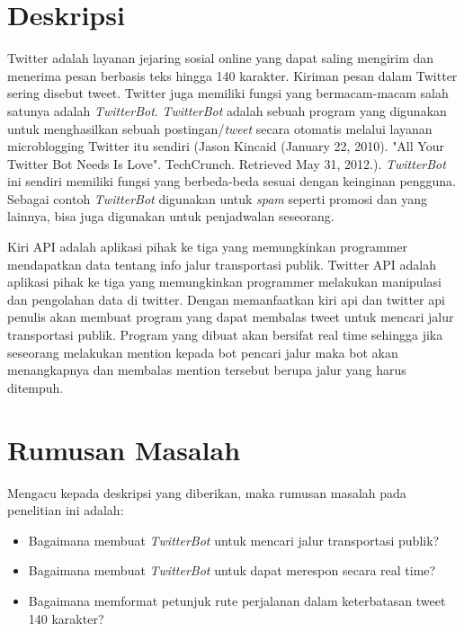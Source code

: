 \documentclass[a4paper,twoside]{article}
\begin{document}
\title{\@judultopik}
\author{\nama \textendash \@npm} 

\newcommand{\nama}{Kevin Theodorus Yonathan}
\newcommand{\@npm}{2011730037}
\newcommand{\@judultopik}{Pembuatan \textit{TwitterBot} Untuk Mencari Jalur Transportasi Publik} %
\newcommand{\jumpemb}{1} %
\newcommand{\tanggal}{05/16/2014}
\maketitle


\section{Deskripsi}

Twitter adalah layanan jejaring sosial online yang dapat saling mengirim dan menerima pesan berbasis teks hingga 140 karakter. Kiriman pesan dalam Twitter sering disebut tweet. Twitter juga  memiliki fungsi yang bermacam-macam salah satunya adalah \textit{TwitterBot}. \textit{TwitterBot} adalah sebuah program yang digunakan untuk menghasilkan sebuah postingan/\textit{tweet} secara otomatis melalui layanan microblogging Twitter itu sendiri  (Jason Kincaid (January 22, 2010). "All Your Twitter Bot Needs Is Love". TechCrunch. Retrieved May 31, 2012.). \textit{TwitterBot} ini sendiri memiliki fungsi yang berbeda-beda sesuai dengan keinginan pengguna. Sebagai contoh \textit{TwitterBot} digunakan untuk \textit{spam} seperti promosi dan yang lainnya, bisa juga digunakan untuk penjadwalan seseorang.

Kiri API adalah aplikasi pihak ke tiga yang memungkinkan programmer mendapatkan data tentang info jalur transportasi publik. Twitter API adalah aplikasi pihak ke tiga yang memungkinkan programmer melakukan manipulasi dan pengolahan data di twitter. Dengan memanfaatkan kiri api dan twitter api penulis akan membuat program yang dapat membalas tweet untuk mencari jalur transportasi publik. Program yang dibuat akan bersifat real time sehingga jika seseorang melakukan mention kepada bot pencari jalur maka bot akan menangkapnya dan membalas mention tersebut berupa jalur yang harus ditempuh.


\section{Rumusan Masalah}
Mengacu kepada deskripsi yang diberikan, maka rumusan masalah pada penelitian ini adalah:
\begin{itemize}
	\item Bagaimana membuat \textit{TwitterBot} untuk mencari jalur transportasi publik?
	\item Bagaimana membuat \textit{TwitterBot} untuk dapat merespon secara real time?
	\item Bagaimana memformat petunjuk rute perjalanan dalam keterbatasan tweet 140 karakter?
\end{itemize}
\end{document}
